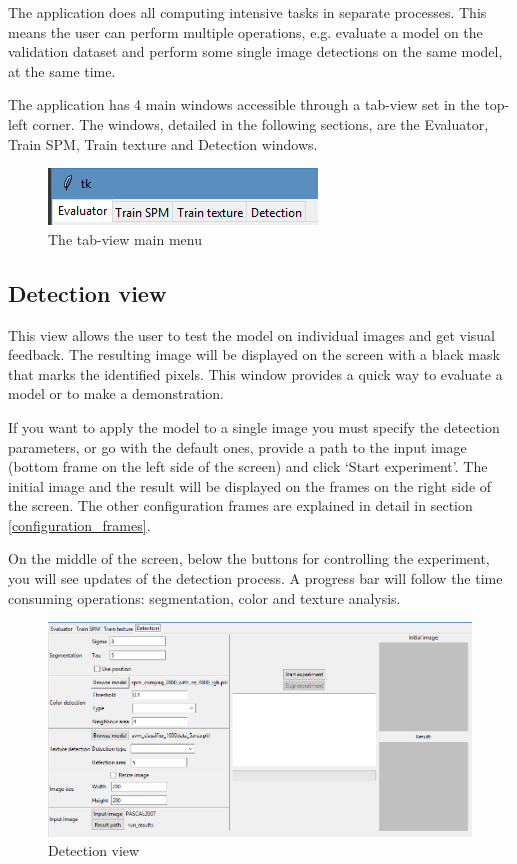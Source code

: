 \documentclass[12pt]{report}
\begin{document}
	The application does all computing intensive tasks in separate processes. This means the user can perform multiple operations, e.g. evaluate a model on the validation dataset and perform some single image detections on the same model, at the same time.
	
	The application has 4 main windows accessible through a tab-view set in the top-left corner. The windows, detailed in the following sections, are the Evaluator, Train SPM, Train texture and Detection windows.
	
	\begin{figure}[h]
		\centering
		\includegraphics{manual/tab_view.png}
		\caption{The tab-view main menu}
	\end{figure}
	
	\subsection{Detection view}
	This view allows the user to test the model on individual images and get visual feedback. The resulting image will be displayed on the screen with a black mask that marks the identified pixels. This window provides a quick way to evaluate a model or to make a demonstration.
	
	If you want to apply the model to a single image you must specify the detection parameters, or go with the default ones, provide a path to the input image (bottom frame on the left side of the screen) and click ‘Start experiment’. The initial image and the result will be displayed on the frames on the right side of the screen. The other configuration frames are explained in detail in section \ref{configuration_frames}. 
	
	On the middle of the screen, below the buttons for controlling the experiment, you will see updates of the detection process. A progress bar will follow the time consuming operations: segmentation, color and texture analysis.
	
	\begin{figure}[h!]
		\centering
		\includegraphics[width=\linewidth]{manual/detection_view.png}
		\caption{Detection view}
	\end{figure}
	
\end{document}
